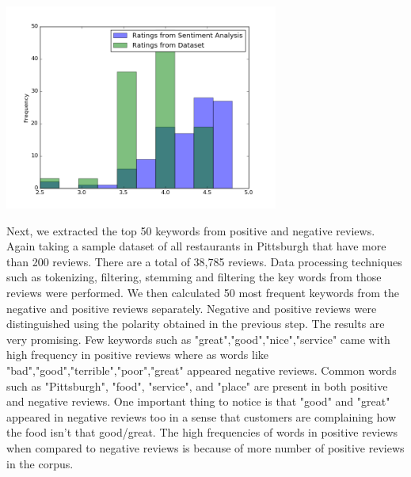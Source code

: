 \documentclass{neu_handout}
\begin{document}
\begin{center}
\includegraphics[width=90mm,scale=0.5]{sentimentanalysis}
\end{center}

Next, we extracted the top 50 keywords from positive and negative reviews. Again taking a sample dataset of all restaurants in Pittsburgh that have more than 200 reviews. There are a total of 38,785 reviews. Data processing techniques such as tokenizing, filtering, stemming and filtering the key words from those reviews were performed. We then calculated 50 most frequent keywords from the negative and positive reviews separately. Negative and positive reviews were distinguished using the polarity obtained in the previous step.
The results are very promising. Few keywords such as "great","good","nice","service" came with high frequency in positive reviews where as words like "bad","good","terrible","poor","great" appeared negative reviews. Common words such as "Pittsburgh", "food", "service", and "place" are present in both positive and negative reviews. One important thing to notice is that "good" and "great" appeared in negative reviews too in a sense that customers are complaining how the food isn't that good/great. The high frequencies of words in positive reviews when compared to negative reviews is because of more number of positive reviews in the corpus.
\end{document}
